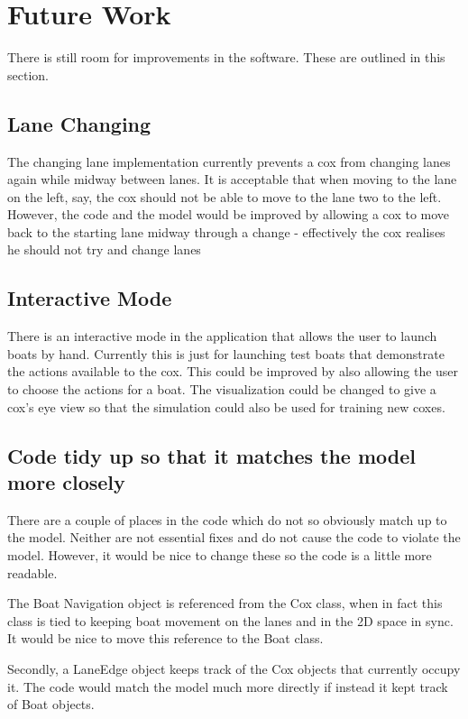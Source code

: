 {\section{Future Work}
There is still room for improvements in the software. These are outlined in this section.

\subsection{Lane Changing}
The changing lane implementation currently prevents a cox from changing lanes again while midway between lanes. It is acceptable that when moving to the lane on the left, say, the cox should not be able to move to the lane two to the left. However, the code and the model would be improved by allowing a cox to move back to the starting lane midway through a change - effectively the cox realises he should not try and change lanes

\subsection{Interactive Mode}
There is an interactive mode in the application that allows the user to launch boats by hand. Currently this is just for launching test boats that demonstrate the actions available to the cox. This could be improved by also allowing the user to choose the actions for a boat. The visualization could be changed to give a cox's eye view so that the simulation could also be used for training new coxes.

\subsection{Code tidy up so that it matches the model more closely}
There are a couple of places in the code which do not so obviously match up to the model. Neither are not essential fixes and do not cause the code to violate the model. However, it would be nice to change these so the code is a little more readable. 

The Boat Navigation object is referenced from the Cox class, when in fact this class is tied to keeping boat movement on the lanes and in the 2D space in sync. It would be nice to move this reference to the Boat class.

Secondly, a LaneEdge object keeps track of the Cox objects that currently occupy it. The code would match the model much more directly if instead it kept track of Boat objects.

}
